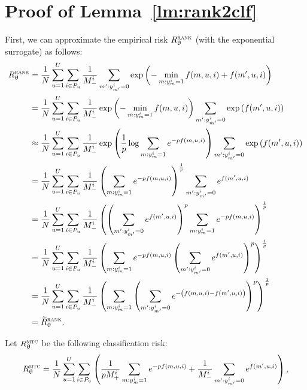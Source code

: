 \section{Proof of Lemma~\ref{lm:rank2clf}}

First, we can approximate the empirical risk $R_{\uptheta}^{\textsc{rank}}$ (with the exponential surrogate) as follows:
\begin{equation*}
\begin{aligned}
R_{\uptheta}^{\textsc{rank}}
&= \frac{1}{N} \sum_{u=1}^U \sum_{i \in P_u} \frac{1}{M_-^i} \sum_{m': y_{m'}^i = 0} \exp \left( -\min_{m: y_m^i = 1} f(m, u, i) + f(m', u, i) \right) \\
&= \frac{1}{N} \sum_{u=1}^U \sum_{i \in P_u} \frac{1}{M_-^i} \exp \left( -\min_{m: y_m^i = 1} f(m, u, i) \right) 
   \sum_{m': y_{m'}^i = 0} \exp \left( f(m', u, i) \right) \\
&\approx \frac{1}{N} \sum_{u=1}^U \sum_{i \in P_u} \frac{1}{M_-^i} \exp \left( \frac{1}{p} \log \sum_{m: y_m^i = 1} e^{-p f(m, u, i)} \right)
   \sum_{m': y_{m'}^i = 0} \exp \left( f(m', u, i) \right) \\
&= \frac{1}{N} \sum_{u=1}^U \sum_{i \in P_u} \frac{1}{M_-^i} \left( \sum_{m: y_m^i = 1} e^{-p f(m, u, i)} \right)^\frac{1}{p} 
   \sum_{m': y_{m'}^i = 0} e^{f(m', u, i)} \\
&= \frac{1}{N} \sum_{u=1}^U \sum_{i \in P_u} \frac{1}{M_-^i} \left( \left( \sum_{m': y_{m'}^i = 0} e^{f(m', u, i)} \right)^p 
   \sum_{m: y_m^i = 1} e^{-p f(m, u, i)} \right)^\frac{1}{p} \\
&= \frac{1}{N} \sum_{u=1}^U \sum_{i \in P_u} \frac{1}{M_-^i} \left( 
   \sum_{m: y_m^i = 1} e^{-p f(m, u, i)} \left( \sum_{m': y_{m'}^i = 0} e^{f(m', u, i)} \right)^p \right)^\frac{1}{p} \\
&= \frac{1}{N} \sum_{u=1}^U \sum_{i \in P_u} \frac{1}{M_-^i} \left( 
   \sum_{m: y_m^i = 1} \left( \sum_{m': y_{m'}^i = 0} e^{- \left( f(m, u, i) - f(m', u, i) \right)} \right)^p \right)^\frac{1}{p} \\
&= \widetilde R_{\uptheta}^{\textsc{rank}}.
\end{aligned}
\end{equation*}

Let $R_{\uptheta}^\textsc{mtc}$ be the following classification risk:
\begin{equation*}
R_{\uptheta}^{\textsc{mtc}}
= \frac{1}{N} \sum_{u=1}^U \sum_{i \in P_u} \left( 
  \frac{1}{p M_+^i} \sum_{m: y_m^i = 1} e^{-p f(m, u, i)} 
  + \frac{1}{M_-^i} \sum_{m': y_{m'}^i = 0} e^{f(m', u, i)} \right),
\end{equation*}


